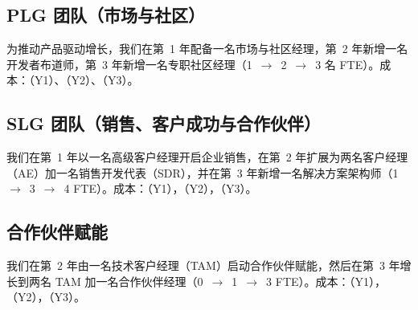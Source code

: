 \documentclass[11pt, a4paper, oneside]{article}
\begin{document}
\subsection{PLG 团队（市场与社区）}
为推动产品驱动增长，我们在第~1 年配备一名市场与社区经理，第~2 年新增一名开发者布道师，第~3 年新增一名专职社区经理（1~$\rightarrow$~2~$\rightarrow$~3 名 FTE）。成本：\textbf{}（Y1）、\textbf{}（Y2）、\textbf{}（Y3）。



\subsection{SLG 团队（销售、客户成功与合作伙伴）}
我们在第~1 年以一名高级客户经理开启企业销售，在第~2 年扩展为两名客户经理（AE）加一名销售开发代表（SDR），并在第~3 年新增一名解决方案架构师（1~$\rightarrow$~3~$\rightarrow$~4 FTE）。成本：\textbf{}（Y1），\textbf{}（Y2），\textbf{}（Y3）。

\subsection{合作伙伴赋能}
我们在第~2 年由一名技术客户经理（TAM）启动合作伙伴赋能，然后在第~3 年增长到两名 TAM 加一名合作伙伴经理（0~$\rightarrow$~1~$\rightarrow$~3 FTE）。成本：\textbf{}（Y1），\textbf{}（Y2），\textbf{}（Y3）。
\end{document}
